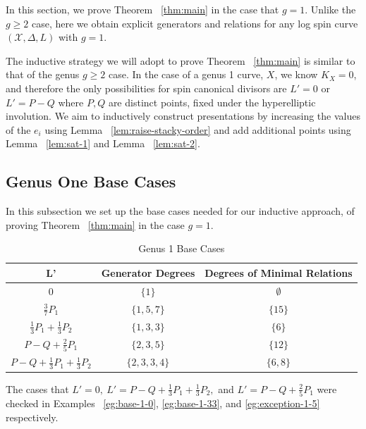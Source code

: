 \documentclass{amsart}
\theoremstyle{plain}
\theoremstyle{definition}
\theoremstyle{remark}
\numberwithin{equation}{section}
\newcommand\ssec{\subsection}
\newcommand \sx{\mathscr X}
\newcommand{\halfcan}{L}
\begin{document}
In this section, we prove Theorem ~\ref{thm:main} in the case that $g = 1$. Unlike the $g \geq 2$ case, here we obtain explicit generators and relations for any log spin curve $(\sx, \Delta, L)$ with $g = 1$.

The inductive strategy we will adopt to prove Theorem ~\ref{thm:main} is similar to that of the genus $g \geq 2$ case. In the case of a genus 1 curve, $X$, we know $K_X = 0$, and therefore the only possibilities for spin canonical divisors are $\halfcan' = 0$ or $\halfcan' = P - Q$ where $P,Q$ are distinct points, fixed  under the hyperelliptic involution. We aim to inductively construct presentations by increasing the values of the $e_i$ using Lemma ~\ref{lem:raise-stacky-order} and add additional points using Lemma ~\ref{lem:sat-1} and Lemma ~\ref{lem:sat-2}.

\ssec{Genus One Base Cases}
\label{ssec:g_1_base}
In this subsection we set up the base cases needed for our inductive approach, of proving Theorem ~\ref{thm:main} in the case $g=1$.

\begin{longtable}	{| c || c | c |}
	\caption{Genus 1 Base Cases}
	\label{table:g-1-base}
	
	\tabularnewline
	
	\hline
	L' & Generator Degrees & Degrees of Minimal Relations \\
	\hline
	\hline
	$0$ & $\{1\}$ & $\emptyset$ \\	\hline

	$\frac{3}{7}P_1$ & $\{1,5,7\}$ & $\{15\}$ \\	\hline
	
	$\frac{1}{3}P_1 + \frac{1}{3}P_2$ & $\{1, 3, 3\}$ & $\{6\}$ \\	\hline
	
	$P - Q + \frac{2}{5}P_1$ & $\{2,3,5\}$ & $\{12\}$ \\	\hline
	
	$P - Q + \frac{1}{3}P_1 + \frac{1}{3}P_2$ & $\{2, 3, 3, 4\}$ & $\{6,8\}$ \\	\hline
	
\end{longtable}

The cases that $L' = 0, \: L' = P-Q +\frac{1}{3}P_1 + \frac{1}{3}P_2,$ and $L' = P-Q + \frac{2}{5}P_1$ were checked in Examples ~\ref{eg:base-1-0}, \ref{eg:base-1-33}, and \ref{eg:exception-1-5} respectively.
\end{document}
